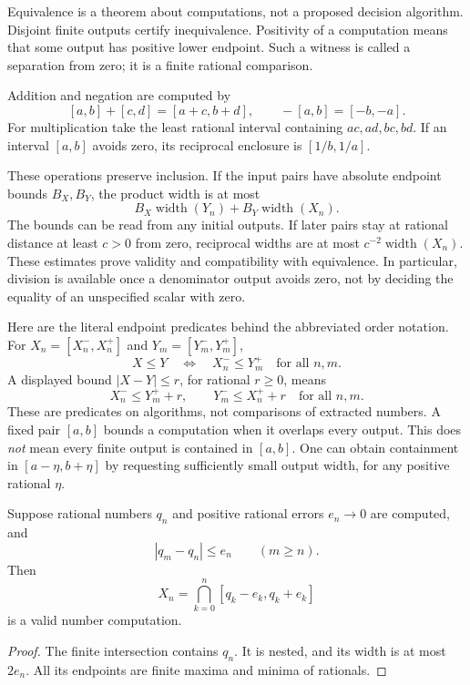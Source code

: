 Equivalence is a theorem about computations, not a proposed decision algorithm.
Disjoint finite outputs certify inequivalence.  Positivity of a computation
means that some output has positive lower endpoint.  Such a witness is
called a separation from zero; it is a finite rational comparison.

\begin{definition}\label{def:raw-real-arithmetic}
Addition and negation are computed by
\[
 [a,b]+[c,d]=[a+c,b+d],\qquad -[a,b]=[-b,-a].
\]
For multiplication take the least rational interval containing
$ac,ad,bc,bd$.  If an interval $[a,b]$ avoids zero, its reciprocal enclosure
is $[1/b,1/a]$.
\end{definition}

These operations preserve inclusion.  If the input pairs have absolute
endpoint bounds $B_X,B_Y$, the product width is at most
\[
 B_X\operatorname{width}(Y_n)+B_Y\operatorname{width}(X_n).
\]
The bounds can be read from any initial outputs.  If later pairs stay at
rational distance at least $c>0$ from zero, reciprocal widths are at most
$c^{-2}\operatorname{width}(X_n)$.  These estimates prove validity
and compatibility with equivalence.  In particular, division is available
once a denominator output avoids zero, not by deciding the equality of an
unspecified scalar with zero.

Here are the literal endpoint predicates behind the abbreviated order
notation.  For $X_n=[X_n^-,X_n^+]$ and $Y_m=[Y_m^-,Y_m^+]$,
\[
 X\le Y\quad\Longleftrightarrow\quad
 X_n^-\le Y_m^+\quad\text{for all }n,m.
\]
A displayed bound $|X-Y|\le r$, for rational $r\ge0$, means
\[
 X_n^-\le Y_m^++r,\qquad Y_m^-\le X_n^++r
 \quad\text{for all }n,m.
\]
These are predicates on algorithms, not comparisons of extracted numbers.
A fixed pair $[a,b]$ bounds a computation when it overlaps every output.
This does \emph{not} mean every finite output is contained in $[a,b]$.
One can obtain containment in $[a-\eta,b+\eta]$ by requesting sufficiently
small output width, for any positive rational $\eta$.

\begin{proposition}\label{prop:raw-prefix-stabilization}
Suppose rational numbers $q_n$ and positive rational errors $e_n\to0$
are computed, and
\[
 |q_m-q_n|\le e_n\qquad(m\ge n).
\]
Then
\[
 X_n=\bigcap_{k=0}^n[q_k-e_k,q_k+e_k]
\]
is a valid number computation.
\end{proposition}
\begin{proof}
The finite intersection contains $q_n$.  It is nested, and its width is at
most $2e_n$.  All its endpoints are finite maxima and minima of rationals.
\end{proof}

